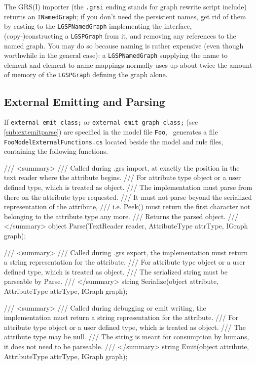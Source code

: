 The GRS(I) importer (the \texttt{.grsi} ending stands for graph rewrite script include) returns an \texttt{INamedGraph};
if you don't need the persistent names, get rid of them by casting to the \texttt{LGSPNamedGraph} implementing the interface, (copy-)constructing a \texttt{LGSPGraph} from it, and removing any references to the named graph.
You may do so because naming is rather expensive (even though worthwhile in the general case):
a \texttt{LGSPNamedGraph} supplying the name to element and element to name mappings normally uses up about twice the amount of memory of the \texttt{LGSPGraph} defining the graph alone.


\subsection*{External Emitting and Parsing}\label{sub:apiextemitparse}
If \texttt{external emit class;} or \texttt{external emit graph class;} (see \ref{sub:extemitparse}) are specified in the model file \texttt{Foo}, \GrG~generates a file \texttt{FooModelExternalFunctions.cs} located beside the model and rule files,
containing the following functions.

\begin{csharplet}
/// <summary>
/// Called during .grs import, at exactly the position in the text reader where the attribute begins.
/// For attribute type object or a user defined type, which is treated as object.
/// The implementation must parse from there on the attribute type requested.
/// It must not parse beyond the serialized representation of the attribute, 
/// i.e. Peek() must return the first character not belonging to the attribute type any more.
/// Returns the parsed object.
/// </summary>
object Parse(TextReader reader, AttributeType attrType, IGraph graph);

/// <summary>
/// Called during .grs export, the implementation must return a string representation for the attribute.
/// For attribute type object or a user defined type, which is treated as object.
/// The serialized string must be parseable by Parse.
/// </summary>
string Serialize(object attribute, AttributeType attrType, IGraph graph);

/// <summary>
/// Called during debugging or emit writing, the implementation must return a string representation for the attribute.
/// For attribute type object or a user defined type, which is treated as object.
/// The attribute type may be null.
/// The string is meant for consumption by humans, it does not need to be parseable.
/// </summary>
string Emit(object attribute, AttributeType attrType, IGraph graph);
\end{csharplet}

